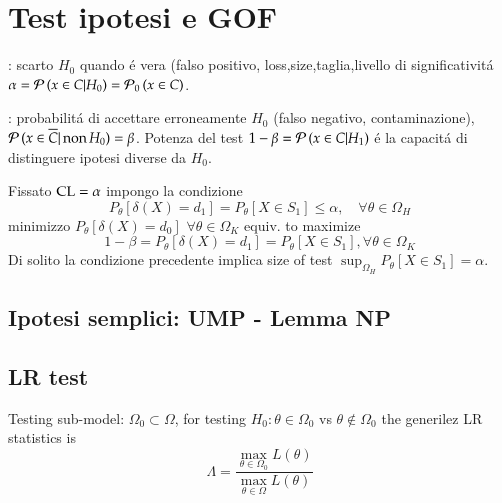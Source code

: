 \documentclass[main.tex]{subfiles}
\begin{document}
\chapter{Test ipotesi e GOF}
\PartialToc

: scarto $H_0$ quando \'e vera (falso positivo, loss,size,taglia,livello di significativit\'a $\alpha=\operatorname{\mathcal{P}}{(x\in C|H_0)}=\operatorname{\mathcal{P}}_0{(x\in C)}$.

: probabilit\'a di accettare erroneamente $H_0$ (falso negativo, contaminazione), $\operatorname{\mathcal{P}}{(x\in\overline{C}|\operatorname{non}{H_0})}=\beta$. Potenza del test $1-\beta=\operatorname{\mathcal{P}}{(x\in C|H_1)}$ \'e la capacit\'a di distinguere ipotesi diverse da $H_0$.

Fissato $\operatorname{CL}=\alpha$ impongo la condizione \[P_{\theta}[\delta(X)=d_1]=P_{\theta}[X\in S_1]\leq\alpha,\quad \forall\theta\in\Omega_H\]
minimizzo $P_{\theta}[\delta(X)=d_0]$ $\forall\theta\in\Omega_K$ equiv. to maximize
\[1-\beta=P_{\theta}[\delta(X)=d_1]=P_{\theta}[X\in S_1], \forall\theta\in\Omega_K\]
Di solito la condizione precedente implica size of test $\sup_{\Omega_H}{P_{\theta}[X\in S_1]}=\alpha$.

\section{Ipotesi semplici: UMP - Lemma NP}

\section{LR test}

Testing sub-model: $\Omega_0\subset\Omega$, for testing $H_0: \theta\in\Omega_0$ vs $\theta\notin\Omega_0$ the generilez LR statistics is
\[\Lambda=\frac{\max_{\theta\in\Omega_0}L(\theta)}{\max_{\theta\in\Omega}L(\theta)}\]
\end{document}
